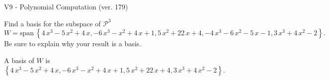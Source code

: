 \begin{exercise}
  \begin{exerciseTitle}V9 - Polynomial Computation (ver. 179)\end{exerciseTitle}
  \begin{exerciseStatement}
    Find a basis for the subspace of \(\mathcal{P}^3\) 
\[W=\mathrm{span}\ \left\{4 \, x^{3} - 5 \, x^{2} + 4 \, x , -6 \, x^{3} - x^{2} + 4 \, x + 1 , 5 \, x^{2} + 22 \, x + 4 , -4 \, x^{3} - 6 \, x^{2} - 5 \, x - 1 , 3 \, x^{3} + 4 \, x^{2} - 2\right\}.\]
 Be sure to explain why your result is a basis.


  \end{exerciseStatement}
  \begin{exerciseAnswer}
   A basis of \(W\) is  \(\left\{4 \, x^{3} - 5 \, x^{2} + 4 \, x , -6 \, x^{3} - x^{2} + 4 \, x + 1 , 5 \, x^{2} + 22 \, x + 4 , 3 \, x^{3} + 4 \, x^{2} - 2\right\}\).
  


  \end{exerciseAnswer}
\end{exercise}